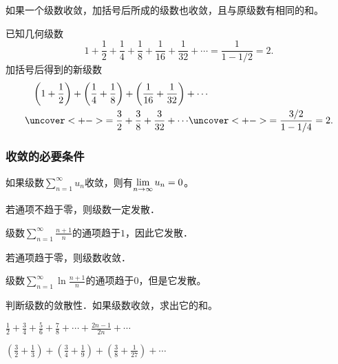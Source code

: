 \documentclass[14pt,notheorems,leqno,xcolor={rgb}]{beamer} %
\begin{document}
\begin{frame}
\begin{property}[收敛级数的结合律]
如果一个级数收敛，加括号后所成的级数也收敛，且与原级数有相同的和。
\end{property}
\vpause
\begin{example}
已知几何级数
$$1+\dfrac12+\dfrac14+\dfrac18+\dfrac1{16}+\dfrac1{32}+\cdots=\dfrac1{1-1/2}=2.$$
\pause 加括号后得到的新级数
\begin{align*}
&\phantom{=}\left(1+\dfrac12\right)+\left(\dfrac14+\dfrac18\right)+\left(\dfrac1{16}+\dfrac1{32}\right)+\cdots\\
&\uncover<+->{=\frac32 + \frac38 + \frac3{32} + \cdots} \uncover<+->{= \frac{3/2}{1-1/4}=2.}
\end{align*}
\end{example}
\vfill{}
\end{frame}

\begin{frame}
\frametitle{收敛的必要条件}
\begin{theorem}
如果级数$\sum\limits_{n=1}^{\infty}u_n$收敛，则有$\lim\limits_{n\to\infty}u_n=0$。
\end{theorem}
\pause\dotfill
\begin{remark}
若通项不趋于零，则级数一定发散．
\end{remark}
\pause
\begin{example}
级数$\sum\limits_{n=1}^{\infty}\frac{n+1}{n}$的通项趋于$1$，因此它发散． 
\end{example}
\pause\dotfill
\begin{remark}
若通项趋于零，则级数收敛．
\end{remark}
\pause
\begin{example}
级数$\sum\limits_{n=1}^{\infty}\ln\frac{n+1}{n}$的通项趋于$0$，但是它发散。
\end{example}
\end{frame}

\begin{frame}
\begin{exercise}
判断级数的敛散性．如果级数收敛，求出它的和。
\begin{enumlite}
  \item $\frac12+\frac34+\frac56+\frac78+\cdots+\frac{2n-1}{2n}+\cdots$
  \item $(\frac32+\frac13)+(\frac34+\frac19)+(\frac38+\frac1{27})+\cdots$
\end{enumlite}
\end{exercise}
\end{frame}
\end{document}
